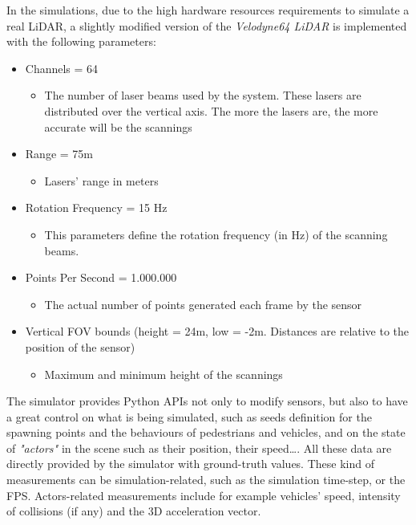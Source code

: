 In the simulations, due to the high hardware resources requirements to simulate a real LiDAR, a slightly modified version of the \textsl{Velodyne64 LiDAR} is implemented with the following parameters:

\begin{itemize}
	\item Channels = 64
	\begin{itemize}
		\item The number of laser beams used by the system. These lasers are distributed over the vertical axis. The more the lasers are, the more accurate will be the scannings
	\end{itemize}
	\item Range = 75m
	\begin{itemize}
		\item Lasers' range in meters
	\end{itemize}
	\item Rotation Frequency = 15 Hz
	\begin{itemize}
		\item This parameters define the rotation frequency (in Hz) of the scanning beams.
	\end{itemize}
	\item Points Per Second = 1.000.000
	\begin{itemize}
		\item The actual number of points generated each frame by the sensor
	\end{itemize}
	\item Vertical FOV bounds (height = 24m, low = -2m. Distances are relative to the position of the sensor)
	\begin{itemize}
		\item Maximum and minimum height of the scannings
	\end{itemize}
\end{itemize}

The simulator provides Python APIs not only to modify sensors, but also to have a great control on what is being simulated, such as seeds definition for the spawning points and the behaviours of pedestrians and vehicles, and on the state of \textsl{"actors"} in the scene such as their position, their speed\dots. All these data are directly provided by the simulator with ground-truth values. These kind of measurements can be simulation-related, such as the simulation time-step, or the FPS. Actors-related measurements include for example vehicles' speed, intensity of collisions (if any) and the 3D acceleration vector.\newline

